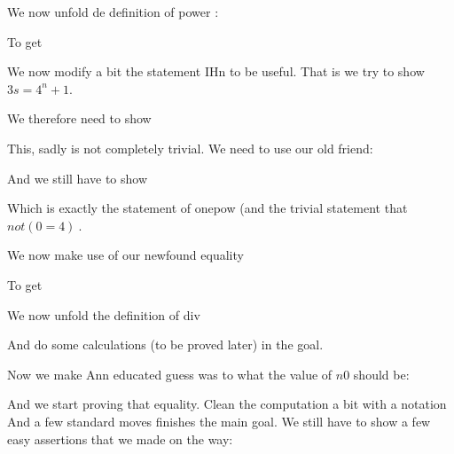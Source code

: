 We now unfold de definition of power :


To get


We now modify a bit the statement IHn to be useful. That is we try to show $3s = 4^n+1$. 

We therefore need to show

This, sadly is not completely trivial. We need to use our old friend:


And we still have to show

Which is exactly the statement of onepow (and the trivial statement that $not(0=4)~$.

We now make use of our newfound equality

To get


We now unfold the definition of div

And do some calculations (to be proved later) in the goal.


Now we make Ann educated guess was to what the value of $n0$ should be:

And we start proving that equality.
Clean the computation a bit with a notation
And a few standard moves 
finishes the main goal. We still have to show a few easy assertions that we made on the way: 

